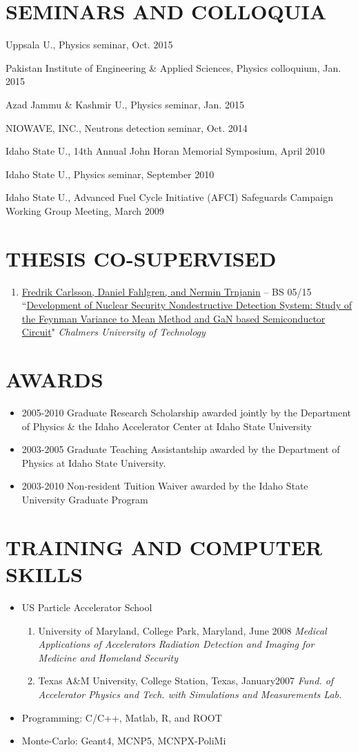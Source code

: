 \documentclass[paper=letter,fontsize=11pt]{scrartcl} %
\newcommand{\NewPart}[2]{\section*{\uppercase{#1} #2}}
\newcommand{\TalkEntry}[4]{
		\noindent #1, #2, #3 #4}
\newcommand{\ThesisEntry}[5]{
		\noindent #1 -- #2 #3 ``#4" \textit{#5}}
\begin{document}
\NewPart{Seminars and Colloquia}{}
\begin{etaremune}
\item\TalkEntry{Uppsala U.}{Physics seminar}{Oct. 2015}
\item\TalkEntry{Pakistan Institute of Engineering \& Applied Sciences}{Physics colloquium}{Jan. 2015}
\item\TalkEntry{Azad Jammu \& Kashmir U.}{Physics seminar}{Jan. 2015}
\item\TalkEntry{NIOWAVE, INC.}{Neutrons detection seminar}{Oct. 2014}
\item\TalkEntry{Idaho State U.}{14th Annual John Horan Memorial Symposium}{April 2010}
\item\TalkEntry{Idaho State U.}{Physics seminar}{September 2010}
\item\TalkEntry{Idaho State U.}{Advanced Fuel Cycle Initiative (AFCI) Safeguards Campaign Working Group Meeting}{March 2009}
\end{etaremune}

\NewPart{Thesis Co-Supervised}{}
\begin{enumerate}
\item\ThesisEntry{\href{}{Fredrik Carlsson, Daniel Fahlgren, and Nermin Trnjanin}}{BS}{05/15}{\href{}{Development of Nuclear Security Nondestructive Detection System: Study of the Feynman Variance to Mean Method and GaN based Semiconductor Circuit}}{Chalmers University of Technology}
\end{enumerate}

\NewPart{Awards}{}
\begin{itemize}
\item 2005-2010 Graduate Research Scholarship awarded jointly by the Department of Physics \& the Idaho Accelerator Center at Idaho State University
\item 2003-2005 Graduate Teaching Assistantship awarded by the Department of Physics at Idaho State University.
\item 2003-2010 Non-resident Tuition Waiver awarded by the Idaho State University Graduate Program
\end{itemize}

\NewPart{TRAINING AND COMPUTER SKILLS}{}
\begin{itemize}
\item {US Particle Accelerator School}
\begin{enumerate}
\item {University of Maryland, College Park, Maryland}{, June 2008}
\subitem \textit{Medical Applications of Accelerators}
\subitem \textit{Radiation Detection and Imaging for Medicine and Homeland Security}

\item Texas A\&M University, College Station, Texas, January2007
\subitem \textit{Fund. of Accelerator Physics and Tech. with Simulations and Measurements Lab.}
\end{enumerate}

\item Programming: C/C++, Matlab, R, and ROOT
\item Monte-Carlo: Geant4, MCNP5, MCNPX-PoliMi

\end{itemize}
\end{document}

